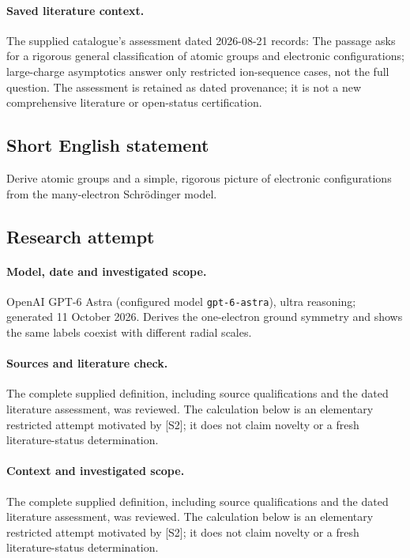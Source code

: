 \documentclass[11pt]{article}
\begin{document}
\paragraph{Saved literature context.} The supplied catalogue's assessment dated 2026-08-21 records: The passage asks for a rigorous general classification of atomic groups and electronic configurations; large-charge asymptotics answer only restricted ion-sequence cases, not the full question. The assessment is retained as dated provenance; it is not a new comprehensive literature or open-status certification.
\subsection{Short English statement}
Derive atomic groups and a simple, rigorous picture of electronic configurations from the many-electron Schrödinger model.
\subsection{Research attempt}
\paragraph{Model, date and investigated scope.}
OpenAI GPT-6 Astra (configured model \texttt{gpt-6-astra}), ultra reasoning; generated 11 October 2026. Derives the one-electron ground symmetry and shows the same labels coexist with different radial scales.

\paragraph{Sources and literature check.}
The complete supplied definition, including source qualifications and the dated literature assessment, was reviewed. The calculation below is an elementary restricted attempt motivated by [S2]; it does not claim novelty or a fresh literature-status determination.

\paragraph{Context and investigated scope.} The complete supplied definition, including source qualifications and the dated literature assessment, was reviewed. The calculation below is an elementary restricted attempt motivated by [S2]; it does not claim novelty or a fresh literature-status determination.
\end{document}
